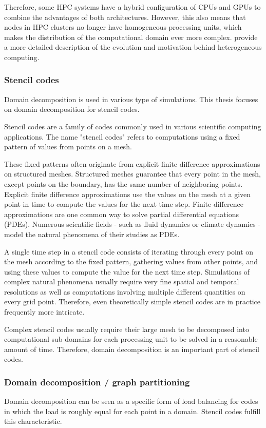 Therefore, some HPC systems have a hybrid configuration of CPUs and GPUs to combine the advantages of both architectures.
However, this also means that nodes in HPC clusters no longer have homogeneous processing units, which makes the distribution of the computational domain ever more complex.
\citet{mittal2015survey} provide a more detailed description of the evolution and motivation behind heterogeneous computing.

\subsubsection{Stencil codes}
Domain decomposition is used in various type of simulations.
This thesis focuses on domain decomposition for stencil codes.

Stencil codes are a family of codes commonly used in various scientific computing applications.
The name "stencil codes" refers to computations using a fixed pattern of values from points on a mesh.

These fixed patterns often originate from explicit finite difference approximations on structured meshes.
Structured meshes guarantee that every point in the mesh, except points on the boundary, has the same number of neighboring points.
Explicit finite difference approximations use the values on the mesh at a given point in time to compute the values for the next time step.
Finite difference approximations are one common way to solve partial differential equations (PDEs).
Numerous scientific fields - such as fluid dynamics or climate dynamics - model the natural phenomena of their studies as PDEs.

A single time step in a stencil code consists of iterating through every point on the mesh according to the fixed pattern, gathering values from other points, and using these values to compute the value for the next time step.
Simulations of complex natural phenomena usually require very fine spatial and temporal resolutions as well as computations involving multiple different quantities on every grid point.
Therefore, even theoretically simple stencil codes are in practice frequently more intricate.

Complex stencil codes usually require their large mesh to be decomposed into computational sub-domains for each processing unit to be solved in a reasonable amount of time.
Therefore, domain decomposition is an important part of stencil codes.

\subsubsection{Domain decomposition / graph partitioning}
Domain decomposition can be seen as a specific form of load balancing for codes in which the load is roughly equal for each point in a domain.
Stencil codes fulfill this characteristic.

